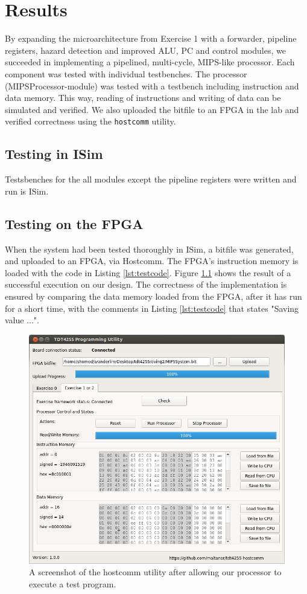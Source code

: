 \chapter{Results}

By expanding the microarchitecture from Exercise 1 \cite{compendium} with a forwarder, pipeline registers, hazard detection and improved ALU, PC and control modules, we succeeded in implementing a pipelined, multi-cycle, MIPS-like processor.
Each component was tested with individual testbenches.
The processor (MIPSProcessor-module) was tested with a testbench including instruction and data memory.
This way, reading of instructions and writing of data can be simulated and verified.
We also uploaded the bitfile to an FPGA in the lab and verified correctness using the \texttt{hostcomm} utility.

\section{Testing in ISim}
Testsbenches for the all modules except the pipeline registers were written and run is ISim. 

\section{Testing on the FPGA}
When the system had been tested thoroughly in ISim, a bitfile was generated, and uploaded to an FPGA, via Hostcomm. The FPGA's instruction memory is loaded with the code in Listing \ref{lst:testcode}. Figure \ref{fig:hostcomm} shows the result of a successful execution on our design. The correctness of the implementation is ensured by comparing the data memory loaded from the FPGA, after it has run for a short time, with the comments in Listing \ref{lst:testcode} that states "Saving value ...".

\begin{figure}[h!]
    \includegraphics[width=\linewidth]{img/hostcomm_result.png}
    \caption{A screenshot of the hostcomm utility after allowing our processor to execute a test program.}
    \label{fig:hostcomm}
\end{figure}

